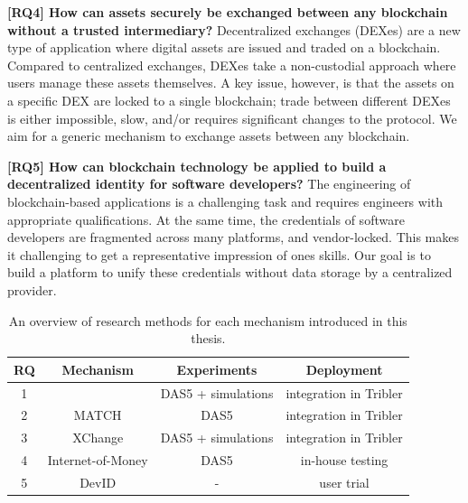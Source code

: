\textbf{[RQ4] How can assets securely be exchanged between any blockchain without a trusted intermediary?}
Decentralized exchanges (DEXes) are a new type of application where digital assets are issued and traded on a blockchain.
Compared to centralized exchanges, DEXes take a non-custodial approach where users manage these assets themselves.
A key issue, however, is that the assets on a specific DEX are locked to a single blockchain; trade between different DEXes is either impossible, slow, and/or requires significant changes to the protocol.
We aim for a generic mechanism to exchange assets between any blockchain.

\textbf{[RQ5] How can blockchain technology be applied to build a decentralized identity for software developers?}
The engineering of blockchain-based applications is a challenging task and requires engineers with appropriate qualifications.
At the same time, the credentials of software developers are fragmented across many platforms, and vendor-locked.
This makes it challenging to get a representative impression of ones skills.
Our goal is to build a platform to unify these credentials without data storage by a centralized provider.


\begin{table}[t]
	\small
	\centering
	\begin{tabular}{ |c|c|c|c| }
		\hline
		\textbf{RQ} & \textbf{Mechanism} & \textbf{Experiments} & \textbf{Deployment} \\ \hline
		1 & \TrustChain{} & DAS5 + simulations & integration in Tribler \\ \hline
		2 & MATCH & DAS5 & integration in Tribler \\ \hline
		3 & XChange & DAS5 + simulations & integration in Tribler \\ \hline
		4 & Internet-of-Money & DAS5 & in-house testing \\ \hline
		5 & DevID & - & user trial \\ \hline
	\end{tabular}
	\caption{An overview of research methods for each mechanism introduced in this thesis.}
	\label{table:research_methodology}
\end{table}

